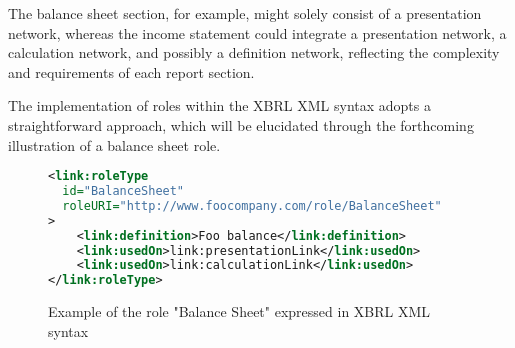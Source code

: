 The balance sheet section, for example, might solely consist of a presentation network, whereas the income statement could integrate a presentation network, 
a calculation network, and possibly a definition network, reflecting the complexity and requirements of each report section.

The implementation of roles within the XBRL XML syntax adopts a straightforward approach, 
which will be elucidated through the forthcoming illustration of a balance sheet role.

\begin{figure}[H]
    \caption{Example of the role "Balance Sheet" expressed in XBRL XML syntax}
    \label{fig:example_role_xbrl}
    \begin{lstlisting}[language=XML,basicstyle=\small\ttfamily]
<link:roleType 
  id="BalanceSheet" 
  roleURI="http://www.foocompany.com/role/BalanceSheet"
>
    <link:definition>Foo balance</link:definition>
    <link:usedOn>link:presentationLink</link:usedOn>
    <link:usedOn>link:calculationLink</link:usedOn>
</link:roleType>
\end{lstlisting}
\end{figure}





